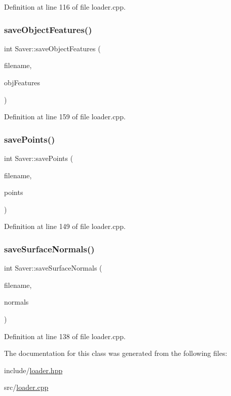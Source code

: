 Definition at line 116 of file loader.\+cpp.

\hypertarget{class_saver_a9d4eb8f7475a1392995cdb24d5b1df12}{}\label{class_saver_a9d4eb8f7475a1392995cdb24d5b1df12} 
\subsubsection{\texorpdfstring{save\+Object\+Features()}{saveObjectFeatures()}}
{\footnotesize\ttfamily int Saver\+::save\+Object\+Features (\begin{DoxyParamCaption}\item[{std\+::string}]{filename,  }\item[{boost\+::shared\+\_\+ptr$<$ \hyperlink{struct_features_1_1_object_features}{Features\+::\+Object\+Features} $>$ \&}]{obj\+Features }\end{DoxyParamCaption})}



Definition at line 159 of file loader.\+cpp.

\hypertarget{class_saver_a7cb13afc54e63deccb5592a9cafcf023}{}\label{class_saver_a7cb13afc54e63deccb5592a9cafcf023} 
\subsubsection{\texorpdfstring{save\+Points()}{savePoints()}}
{\footnotesize\ttfamily int Saver\+::save\+Points (\begin{DoxyParamCaption}\item[{std\+::string}]{filename,  }\item[{pcl\+::\+Point\+Cloud$<$ pcl\+::\+Point\+X\+Y\+Z\+R\+GB $>$\+::Ptr \&}]{points }\end{DoxyParamCaption})}



Definition at line 149 of file loader.\+cpp.

\hypertarget{class_saver_ae495a4a2592cd981a4085b35f9645d32}{}\label{class_saver_ae495a4a2592cd981a4085b35f9645d32} 
\subsubsection{\texorpdfstring{save\+Surface\+Normals()}{saveSurfaceNormals()}}
{\footnotesize\ttfamily int Saver\+::save\+Surface\+Normals (\begin{DoxyParamCaption}\item[{std\+::string}]{filename,  }\item[{pcl\+::\+Point\+Cloud$<$ pcl\+::\+Normal $>$\+::Ptr \&}]{normals }\end{DoxyParamCaption})}



Definition at line 138 of file loader.\+cpp.



The documentation for this class was generated from the following files\+:\begin{DoxyCompactItemize}
\item 
include/\hyperlink{loader_8hpp}{loader.\+hpp}\item 
src/\hyperlink{loader_8cpp}{loader.\+cpp}\end{DoxyCompactItemize}
